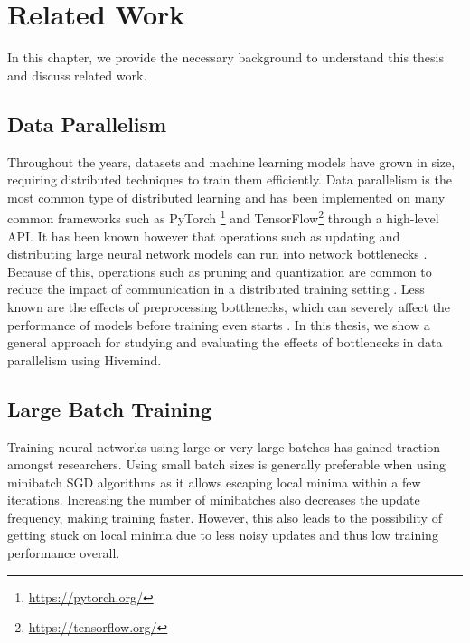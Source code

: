 \chapter{Related Work}\label{chapter:related-work}
In this chapter, we provide the necessary background to understand this thesis and discuss related work.

\section{Data Parallelism}
Throughout the years, datasets and machine learning models have grown in size, requiring distributed techniques to train them efficiently.
Data parallelism is the most common type of distributed learning and has been implemented on many common frameworks such as PyTorch \footnote{\href{https://pytorch.org/}{https://pytorch.org/}} and TensorFlow\footnote{\href{https://tensorflow.org/}{https://tensorflow.org/}} through a high-level API.
It has been known however that operations such as updating and distributing large neural network models can run into network bottlenecks \cite{10.48550/arxiv.1705.08741, DBLP:journals/corr/abs-2003-11316, 10.5555/2999134.2999271, DBLP:journals/corr/abs-1811-03600}.
Because of this, operations such as pruning and quantization are common to reduce the impact of communication in a distributed training setting \cite{10.48550/arxiv.2003.03033, 10.48550/arxiv.1510.00149}.
Less known are the effects of preprocessing bottlenecks, which can severely affect the performance of models before training even starts \cite{isenko2022bottleneck, 10.1145/3448016.3457566}.
In this thesis, we show a general approach for studying and evaluating the effects of bottlenecks in data parallelism using Hivemind.

\section{Large Batch Training}
Training neural networks using large or very large batches \cite{DBLP:journals/corr/KeskarMNST16, 10.48550/arxiv.1705.08741} has gained traction amongst researchers.
Using small batch sizes is generally preferable when using minibatch SGD algorithms as it allows escaping local minima within a few iterations.
Increasing the number of minibatches also decreases the update frequency, making training faster.
However, this also leads to the possibility of getting stuck on local minima due to less noisy updates and thus low training performance overall.

